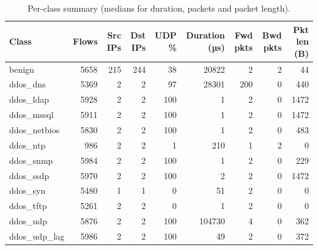 \begin{table}[htbp]
\centering
\small
\setlength{\tabcolsep}{3pt}
\caption{Per-class summary (medians for duration, packets and packet length).}
\label{tab:per_class_summary}
\begin{tabular}{lrrrrrrrr}
\toprule
Class & Flows & Src IPs & Dst IPs & UDP \% & Duration (µs) & Fwd pkts & Bwd pkts & Pkt len (B) \\
\midrule
benign & 5658 & 215 & 244 & 38 & 20822 & 2 & 2 & 44 \\
ddos\_dns & 5369 & 2 & 2 & 97 & 28301 & 200 & 0 & 440 \\
ddos\_ldap & 5928 & 2 & 2 & 100 & 1 & 2 & 0 & 1472 \\
ddos\_mssql & 5911 & 2 & 2 & 100 & 1 & 2 & 0 & 1472 \\
ddos\_netbios & 5830 & 2 & 2 & 100 & 1 & 2 & 0 & 483 \\
ddos\_ntp & 986 & 2 & 2 & 1 & 210 & 1 & 2 & 0 \\
ddos\_snmp & 5984 & 2 & 2 & 100 & 1 & 2 & 0 & 229 \\
ddos\_ssdp & 5970 & 2 & 2 & 100 & 2 & 2 & 0 & 1472 \\
ddos\_syn & 5480 & 1 & 1 & 0 & 51 & 2 & 0 & 0 \\
ddos\_tftp & 5261 & 2 & 2 & 0 & 1 & 2 & 0 & 0 \\
ddos\_udp & 5876 & 2 & 2 & 100 & 104730 & 4 & 0 & 362 \\
ddos\_udp\_lag & 5986 & 2 & 2 & 100 & 49 & 2 & 0 & 372 \\
\bottomrule
\end{tabular}
\end{table}
